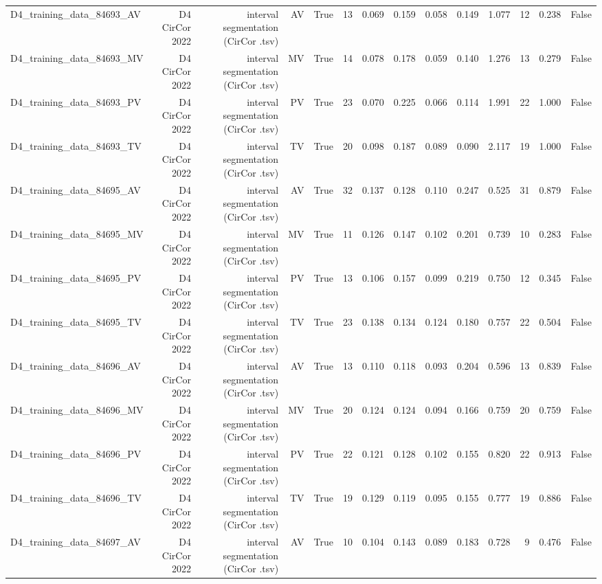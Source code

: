 \begin{table}[htbp]
\begin{tabular}{lrrrrrrrrrrrrr}
    D4\_training\_data\_84693\_AV & D4 CirCor 2022 & interval segmentation (CirCor .tsv) & AV & True & 13 & 0.069 & 0.159 & 0.058 & 0.149 & 1.077 & 12 & 0.238 & False \\
    D4\_training\_data\_84693\_MV & D4 CirCor 2022 & interval segmentation (CirCor .tsv) & MV & True & 14 & 0.078 & 0.178 & 0.059 & 0.140 & 1.276 & 13 & 0.279 & False \\
    D4\_training\_data\_84693\_PV & D4 CirCor 2022 & interval segmentation (CirCor .tsv) & PV & True & 23 & 0.070 & 0.225 & 0.066 & 0.114 & 1.991 & 22 & 1.000 & False \\
    D4\_training\_data\_84693\_TV & D4 CirCor 2022 & interval segmentation (CirCor .tsv) & TV & True & 20 & 0.098 & 0.187 & 0.089 & 0.090 & 2.117 & 19 & 1.000 & False \\
    D4\_training\_data\_84695\_AV & D4 CirCor 2022 & interval segmentation (CirCor .tsv) & AV & True & 32 & 0.137 & 0.128 & 0.110 & 0.247 & 0.525 & 31 & 0.879 & False \\
    D4\_training\_data\_84695\_MV & D4 CirCor 2022 & interval segmentation (CirCor .tsv) & MV & True & 11 & 0.126 & 0.147 & 0.102 & 0.201 & 0.739 & 10 & 0.283 & False \\
    D4\_training\_data\_84695\_PV & D4 CirCor 2022 & interval segmentation (CirCor .tsv) & PV & True & 13 & 0.106 & 0.157 & 0.099 & 0.219 & 0.750 & 12 & 0.345 & False \\
    D4\_training\_data\_84695\_TV & D4 CirCor 2022 & interval segmentation (CirCor .tsv) & TV & True & 23 & 0.138 & 0.134 & 0.124 & 0.180 & 0.757 & 22 & 0.504 & False \\
    D4\_training\_data\_84696\_AV & D4 CirCor 2022 & interval segmentation (CirCor .tsv) & AV & True & 13 & 0.110 & 0.118 & 0.093 & 0.204 & 0.596 & 13 & 0.839 & False \\
    D4\_training\_data\_84696\_MV & D4 CirCor 2022 & interval segmentation (CirCor .tsv) & MV & True & 20 & 0.124 & 0.124 & 0.094 & 0.166 & 0.759 & 20 & 0.759 & False \\
    D4\_training\_data\_84696\_PV & D4 CirCor 2022 & interval segmentation (CirCor .tsv) & PV & True & 22 & 0.121 & 0.128 & 0.102 & 0.155 & 0.820 & 22 & 0.913 & False \\
    D4\_training\_data\_84696\_TV & D4 CirCor 2022 & interval segmentation (CirCor .tsv) & TV & True & 19 & 0.129 & 0.119 & 0.095 & 0.155 & 0.777 & 19 & 0.886 & False \\
    D4\_training\_data\_84697\_AV & D4 CirCor 2022 & interval segmentation (CirCor .tsv) & AV & True & 10 & 0.104 & 0.143 & 0.089 & 0.183 & 0.728 & 9 & 0.476 & False \\

\end{tabular}
\end{table}
